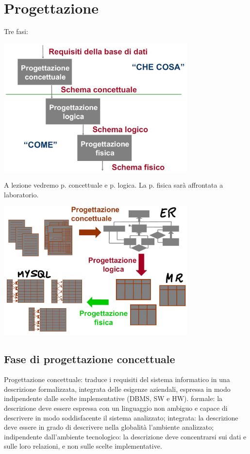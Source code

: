 \section{Progettazione}
Tre fasi:
\begin{center}
    \includegraphics[width=0.75\textwidth]{chaptersLezioniSara/img/progettazione2.jpg}
\end{center}
A lezione vedremo p. concettuale e p. logica. La p. fisica sarà affrontata a laboratorio.
\begin{center}
    \includegraphics[width=0.75\textwidth]{chaptersLezioniSara/img/progettazione3.jpg}
\end{center}

\subsection{Fase di progettazione concettuale}
Progettazione concettuale: traduce i requisiti del sistema
informatico in una descrizione formalizzata, integrata delle
esigenze aziendali, espressa in modo indipendente dalle scelte
implementative (DBMS, SW e HW).
formale: la descrizione deve essere espressa con un
linguaggio non ambiguo e capace di descrivere in modo
soddisfacente il sistema analizzato;
integrata: la descrizione deve essere in grado di descrivere
nella globalità l'ambiente analizzato;
indipendente dall'ambiente tecnologico: la descrizione deve
concentrarsi sui dati e sulle loro relazioni, e non sulle scelte
implementative.

